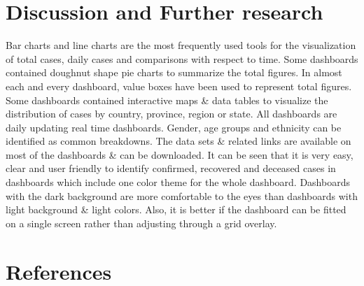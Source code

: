 \documentclass[
]{article}
\begin{document}
\hypertarget{conclusions}{%
\section{Discussion and Further research}\label{conclusions}}

Bar charts and line charts are the most frequently used tools for the
visualization of total cases, daily cases and comparisons with respect
to time. Some dashboards contained doughnut shape pie charts to
summarize the total figures. In almost each and every dashboard, value
boxes have been used to represent total figures. Some dashboards
contained interactive maps \& data tables to visualize the distribution
of cases by country, province, region or state. All dashboards are daily
updating real time dashboards. Gender, age groups and ethnicity can be
identified as common breakdowns. The data sets \& related links are
available on most of the dashboards \& can be downloaded. It can be seen
that it is very easy, clear and user friendly to identify confirmed,
recovered and deceased cases in dashboards which include one color theme
for the whole dashboard. Dashboards with the dark background are more
comfortable to the eyes than dashboards with light background \& light
colors. Also, it is better if the dashboard can be fitted on a single
screen rather than adjusting through a grid overlay.

\hypertarget{references}{%
\section{References}\label{references}}
\end{document}
